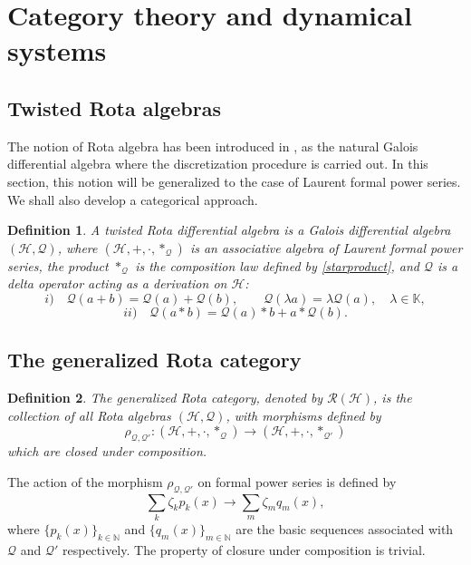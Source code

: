 \documentclass[10pt]{amsart}
\numberwithin{equation}{section}
\newtheorem{definition}{Definition}
\theoremstyle{definition}
\begin{document}
\section{Category theory and dynamical systems}
\label{sec4}

\subsection{Twisted Rota algebras}
\label{sec4.1}

The notion of Rota algebra has been introduced in \cite{TempestaJDE}, as
the natural Galois differential algebra where the discretization procedure
is carried out. In this section, this notion will be generalized to the
case of Laurent formal power series. We shall also develop a categorical
approach.

\begin{definition}
\label{defn5}
A twisted Rota differential algebra is a Galois differential algebra
$(\mathcal{H}, \mathcal{Q})$, where
$(\mathcal{H}, +, \cdot , *_{\mathcal{Q}})$ is an associative algebra of
Laurent formal power series, the product $*_{\mathcal{Q}}$ is the composition
law defined by \eqref{starproduct}, and $\mathcal{Q}$ is a delta operator
acting as a derivation on $\mathcal{H}$:
\begin{equation}
i) \quad \mathcal{Q}(a+b)=\mathcal{Q}(a)+\mathcal{Q}(b),
\qquad
\mathcal{Q}(\lambda a)=\lambda \mathcal{Q}(a), \quad \lambda \in
\mathbb{K},
\label{eq4.1}
\end{equation}
\begin{equation}
ii) \quad \mathcal{Q}(a*b)= \mathcal{Q}(a)*b+a*\mathcal{Q}(b).
\label{eq4.2}
\end{equation}
\end{definition}

\subsection{The generalized Rota category}
\label{sec4.2}

\begin{definition}
\label{defn6}
The generalized Rota category, denoted by $\mathcal{R}(\mathcal{H})$, is
the collection of all Rota algebras $(\mathcal{H}, \mathcal{Q})$, with
morphisms defined by
\begin{equation}
\rho _{\mathcal{Q},\mathcal{Q}'}: (\mathcal{H}, +, \cdot , *_{
\mathcal Q})\longrightarrow (\mathcal{H}, +, \cdot , *_{\mathcal{Q'}})
\label{rotamorphism}
\end{equation}
which are closed under composition.
\end{definition}
The action of the morphism $\rho _{\mathcal{Q},\mathcal{Q}'}$ on formal
power series is defined by
\begin{equation}
\sum _{k} \zeta _{k} p_{k} (x) \longrightarrow \sum _{m} \zeta _{m} q_{m}(x),
\label{morphism}
\end{equation}
where $\{p_{k}(x)\}_{k\in \mathbb{N}}$ and
$\{q_{m}(x)\}_{m\in \mathbb{N}}$ are the basic sequences associated with
$\mathcal{Q}$ and $\mathcal{Q}'$ respectively. The property of closure
under composition is trivial.
\end{document}
